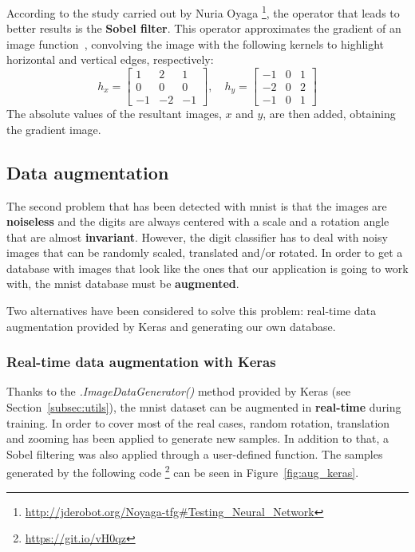 According to the study carried out by Nuria Oyaga \footnote{\url{http://jderobot.org/Noyaga-tfg\#Testing\_Neural\_Network}}, the operator that leads to better results is the \textbf{Sobel filter}. This operator approximates the gradient of an image function~\cite{sonka1999image}, convolving the image with the following kernels to highlight horizontal and vertical edges, respectively:  
\begin{equation}\label{eq:sobel}
h_x = 
\begin{bmatrix}
1 & 2 & 1\\
0 & 0 & 0\\
-1 & -2 & -1
\end{bmatrix}
,\quad
h_y = 
\begin{bmatrix}
-1 & 0 & 1\\
-2 & 0 & 2\\
-1 & 0 & 1
\end{bmatrix}
\end{equation}
The absolute values of the resultant images, $x$ and $y$, are then added, obtaining the gradient image.

\subsection{Data augmentation}
The second problem that has been detected with \gls{mnist} is that the images are \textbf{noiseless} and the digits are always centered with a scale and a rotation angle that are almost \textbf{invariant}. However, the digit classifier has to deal with noisy images that can be randomly scaled, translated and/or rotated. In order to get a database with images that look like the ones that our application is going to work with, the \gls{mnist} database must be \textbf{augmented}.

Two alternatives have been considered to solve this problem: real-time data augmentation provided by Keras and generating our own database.

\subsubsection{Real-time data augmentation with Keras}
Thanks to the \textit{.ImageDataGenerator()} method provided by Keras (see Section~\ref{subsec:utils}), the \gls{mnist} dataset can be augmented in \textbf{real-time} during training. In order to cover most of the real cases, random rotation, translation and zooming has been applied to generate new samples. In addition to that, a Sobel filtering was also applied through a user-defined function. The samples generated by the following code \footnote{\url{https://git.io/vH0qz}} can be seen in Figure~\ref{fig:aug_keras}.

